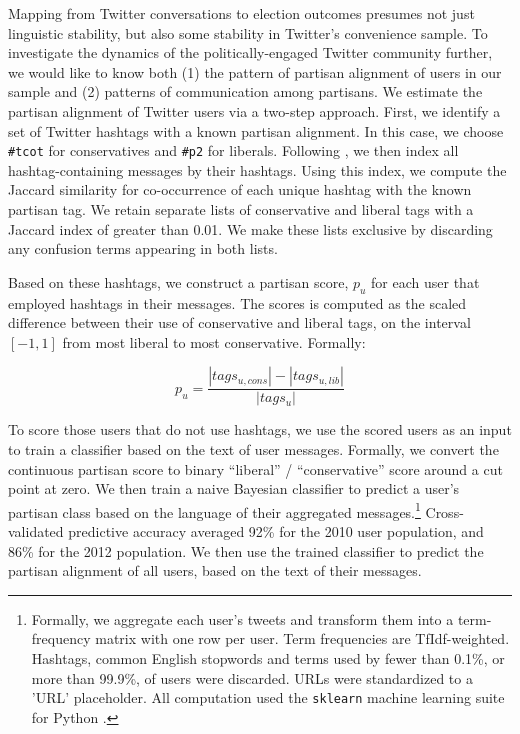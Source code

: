 \documentclass{article}
\begin{document}
Mapping from Twitter conversations to election outcomes presumes not
just linguistic stability, but also some stability in Twitter's
convenience sample. To investigate the dynamics of the
politically-engaged Twitter community further, we would like to know
both (1) the pattern of partisan alignment of users in our sample and
(2) patterns of communication among partisans. We estimate the
partisan alignment of Twitter users via a two-step approach. First, we
identify a set of Twitter hashtags with a known partisan alignment. In
this case, we choose \texttt{\#tcot} for conservatives and
\texttt{\#p2} for liberals. Following \cite{conover2011}, we then
index all hashtag-containing messages by their hashtags. Using this
index, we compute the Jaccard similarity for co-occurrence of each
unique hashtag with the known partisan tag. We retain separate lists
of conservative and liberal tags with a Jaccard index of greater than
0.01. We make these lists exclusive by discarding any confusion terms
appearing in both lists.

Based on these hashtags, we construct a partisan score, $p_u$ for each
user that employed hashtags in their messages. The scores is computed
as the scaled difference between their use of conservative and liberal
tags, on the interval $[-1, 1]$ from most liberal to most
conservative. Formally:

 \begin{equation}
   \label{eq:pscore}
   p_u = \frac{\left|tags_{u,cons}\right| - \left|tags_{u, lib}\right|}{\left|tags_u\right|}
 \end{equation}

To score those users that do not use hashtags, we use the scored users
as an input to train a classifier based on the text of user
messages. Formally, we convert the continuous partisan score to binary
``liberal'' / ``conservative'' score around a cut point at zero. We
then train a naive Bayesian classifier to predict a user's
partisan class based on the language of their aggregated
messages.\footnote{Formally, we aggregate each user's tweets and
transform them into a term-frequency matrix with one row per
user. Term frequencies are TfIdf-weighted. Hashtags,
common English stopwords and terms used by fewer than 0.1\%, or more
than 99.9\%, of users were discarded. URLs were standardized to a
'URL' placeholder. All computation used the \texttt{sklearn} machine
learning suite for Python \cite{scikit-learn}.} Cross-validated
predictive accuracy averaged 92\% for the 2010 user population, and
86\% for the 2012 population. We then use the trained classifier to
predict the partisan alignment of all users, based on the text of
their messages.
\end{document}
